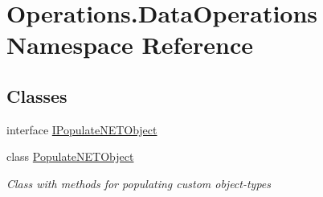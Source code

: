 \hypertarget{namespace_operations_1_1_data_operations}{}\section{Operations.\+Data\+Operations Namespace Reference}
\label{namespace_operations_1_1_data_operations}
\subsection*{Classes}
\begin{DoxyCompactItemize}
\item 
interface \hyperlink{interface_operations_1_1_data_operations_1_1_i_populate_n_e_t_object}{I\+Populate\+N\+E\+T\+Object}
\item 
class \hyperlink{class_operations_1_1_data_operations_1_1_populate_n_e_t_object}{Populate\+N\+E\+T\+Object}
\begin{DoxyCompactList}\small\item\em Class with methods for populating custom object-\/types \end{DoxyCompactList}\end{DoxyCompactItemize}
